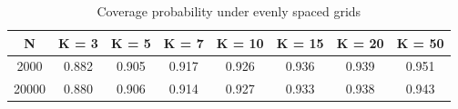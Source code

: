 \begin{table}[!h]
\centering
\caption{\label{tab:coverage_even_nonsmooth}Coverage probability under evenly spaced grids}
\centering
\begin{tabular}[t]{cccccccc}
\toprule
N & K = 3 & K = 5 & K = 7 & K = 10 & K = 15 & K = 20 & K = 50\\
\midrule
2000 & 0.882 & 0.905 & 0.917 & 0.926 & 0.936 & 0.939 & 0.951\\
20000 & 0.880 & 0.906 & 0.914 & 0.927 & 0.933 & 0.938 & 0.943\\
\bottomrule
\end{tabular}
\end{table}